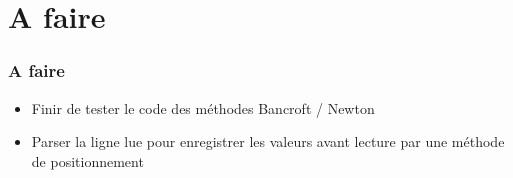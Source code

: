 \documentclass[12pt]{beamer}
\begin{document}
	\section{A faire}
	\begin{frame}
	\frametitle{A faire}
	    \begin{alertblock}{}
    	    \begin{itemize}
    	    [triangle]
    	        \item Finir de tester le code des méthodes Bancroft / Newton
    	        \item Parser la ligne lue pour enregistrer les valeurs avant lecture par une méthode de positionnement
    	    \end{itemize}
	    \end{alertblock}
	\end{frame}
\end{document}
